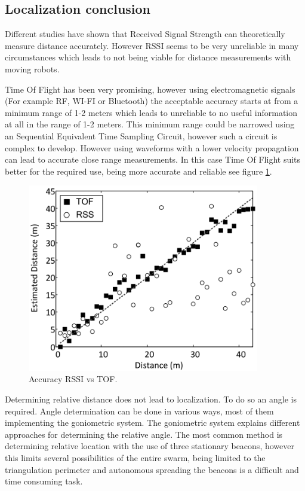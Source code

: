 \documentclass[10pt,a4paper]{article}
\begin{document}
\subsection{Localization conclusion}
Different studies have shown that Received Signal Strength can theoretically measure distance accurately. However RSSI seems to be very unreliable in many circumstances which leads to not being viable for distance measurements with moving robots. 

Time Of Flight has been very promising, however using electromagnetic signals (For example RF, WI-FI or Bluetooth) the acceptable accuracy starts at from a minimum range of 1-2 meters which leads to unreliable to no useful information at all in the range of 1-2 meters. This minimum range could be narrowed using an Sequential Equivalent Time Sampling Circuit, however such a circuit is complex to develop. However using waveforms with a lower velocity propagation can lead to accurate close range measurements. In this case Time Of Flight suits better for the required use, being more accurate and reliable see figure \ref{RSSIvsTOF}.\cite{TOF}

\begin{figure}[H]
\centering
\includegraphics[width=0.9\textwidth]{RSSIvsTOF.pdf}
\caption{Accuracy RSSI vs TOF.\cite{TOF}} 
\label{RSSIvsTOF}
\end{figure}

Determining relative distance does not lead to localization. To do so an angle is required. Angle determination can be done in various ways, most of them implementing the goniometric system. The goniometric system explains different approaches for determining the relative angle. The most common method is determining relative location with the use of three stationary beacons, however this limits several possibilities of the entire swarm, being limited to the triangulation perimeter and autonomous spreading the beacons is a difficult and time consuming task.
\end{document}
